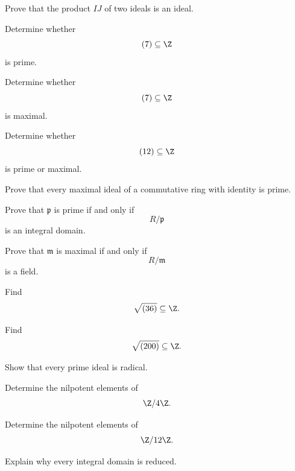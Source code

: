 \begin{exercise}[2]
Prove that the product \(IJ\) of two ideals is an ideal.
\end{exercise}

\begin{exercise}[1]
Determine whether
\[ (7)\subseteq\Z \]
is prime.
\end{exercise}

\begin{exercise}[1]
Determine whether
\[ (7)\subseteq\Z \]
is maximal.
\end{exercise}

\begin{exercise}[1]
Determine whether
\[ (12)\subseteq\Z \]
is prime or maximal.
\end{exercise}

\begin{exercise}[2]
Prove that every maximal ideal of a commutative ring with identity is prime.
\end{exercise}

\begin{exercise}[2]
Prove that \(\mathfrak p\) is prime if and only if
\[ R/\mathfrak p \]
is an integral domain.
\end{exercise}

\begin{exercise}[2]
Prove that \(\mathfrak m\) is maximal if and only if
\[ R/\mathfrak m \]
is a field.
\end{exercise}

\begin{exercise}[1]
Find
\[ \sqrt{(36)}\subseteq\Z. \]
\end{exercise}

\begin{exercise}[1]
Find
\[ \sqrt{(200)}\subseteq\Z. \]
\end{exercise}

\begin{exercise}[2]
Show that every prime ideal is radical.
\end{exercise}

\begin{exercise}[2]
Determine the nilpotent elements of
\[ \Z/4\Z. \]
\end{exercise}

\begin{exercise}[2]
Determine the nilpotent elements of
\[ \Z/12\Z. \]
\end{exercise}

\begin{exercise}[1]
Explain why every integral domain is reduced.
\end{exercise}

